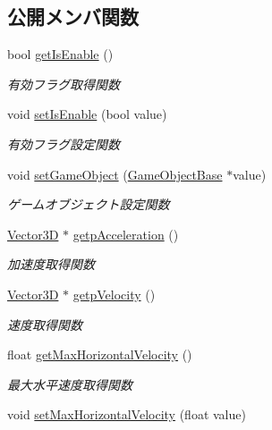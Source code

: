 \subsection*{公開メンバ関数}
\begin{DoxyCompactItemize}
\item 
bool \mbox{\hyperlink{class_physics_a9f7d1579ed7e0f97726ca7117f479c45}{get\+Is\+Enable}} ()
\begin{DoxyCompactList}\small\item\em 有効フラグ取得関数 \end{DoxyCompactList}\item 
void \mbox{\hyperlink{class_physics_a7ae1ceeab958b0a86cb7e570e5e405b5}{set\+Is\+Enable}} (bool value)
\begin{DoxyCompactList}\small\item\em 有効フラグ設定関数 \end{DoxyCompactList}\item 
void \mbox{\hyperlink{class_physics_a8362e2d029415bc93b25b0891cc8a3d8}{set\+Game\+Object}} (\mbox{\hyperlink{class_game_object_base}{Game\+Object\+Base}} $\ast$value)
\begin{DoxyCompactList}\small\item\em ゲームオブジェクト設定関数 \end{DoxyCompactList}\item 
\mbox{\hyperlink{class_vector3_d}{Vector3D}} $\ast$ \mbox{\hyperlink{class_physics_a41b427ec429632a13db548bb5cc6642e}{getp\+Acceleration}} ()
\begin{DoxyCompactList}\small\item\em 加速度取得関数 \end{DoxyCompactList}\item 
\mbox{\hyperlink{class_vector3_d}{Vector3D}} $\ast$ \mbox{\hyperlink{class_physics_a6025f297e751c71a3c54260007c175ee}{getp\+Velocity}} ()
\begin{DoxyCompactList}\small\item\em 速度取得関数 \end{DoxyCompactList}\item 
float \mbox{\hyperlink{class_physics_a47edf04cb497a621940b3dfc5e9e6993}{get\+Max\+Horizontal\+Velocity}} ()
\begin{DoxyCompactList}\small\item\em 最大水平速度取得関数 \end{DoxyCompactList}\item 
void \mbox{\hyperlink{class_physics_a4e8108eeaa958c99543fe2ec3e21b240}{set\+Max\+Horizontal\+Velocity}} (float value)

\end{DoxyCompactItemize}
